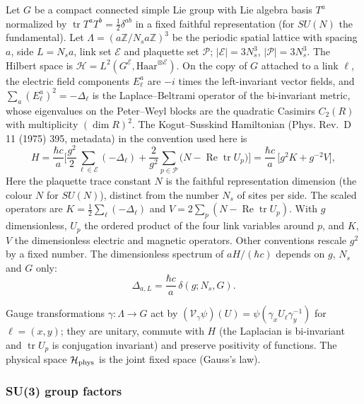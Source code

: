\documentclass[11pt,a4paper]{article}
\begin{document}
Let \(G\) be a compact connected simple Lie group with Lie algebra basis
\(T^a\) normalized by \(\operatorname{tr}T^aT^b=\tfrac12\delta^{ab}\) in
a fixed faithful representation (for \(SU(N)\) the fundamental). Let
\(\Lambda=(a\mathbb Z/N_sa\mathbb Z)^3\) be the periodic spatial lattice
with spacing \(a\), side \(L=N_sa\), link set \(\mathcal E\) and
plaquette set \(\mathcal P\); \(|\mathcal E|=3N_s^3\),
\(|\mathcal P|=3N_s^3\). The Hilbert space is
\(\mathcal H=L^2(G^{\mathcal E},\mathrm{Haar}^{\otimes\mathcal E})\). On
the copy of \(G\) attached to a link \(\ell\), the electric field
components \(E^a_\ell\) are \(-i\) times the left-invariant vector
fields, and \(\sum_a(E^a_\ell)^2=-\Delta_\ell\) is the Laplace--Beltrami
operator of the bi-invariant metric, whose eigenvalues on the
Peter--Weyl blocks are the quadratic Casimirs \(C_2(R)\) with
multiplicity \((\dim R)^2\). The Kogut--Susskind Hamiltonian (Phys.
Rev.~D 11 (1975) 395, metadata) in the convention used here is
\[H=\frac{\hbar c}{a}\Big[\frac{g^2}{2}\sum_{\ell\in\mathcal E}(-\Delta_\ell)
+\frac{2}{g^2}\sum_{p\in\mathcal P}\big(N-\operatorname{Re}\operatorname{tr}U_p\big)\Big]
=\frac{\hbar c}{a}\,\big[g^2K+g^{-2}V\big],\] Here the plaquette trace
constant \(N\) is the faithful representation dimension (the colour
\(N\) for \(SU(N)\)), distinct from the number \(N_s\) of sites per
side. The scaled operators are \(K=\tfrac12\sum_\ell(-\Delta_\ell)\) and
\(V=2\sum_p(N-\operatorname{Re}\operatorname{tr}U_p)\). With \(g\)
dimensionless, \(U_p\) the ordered product of the four link variables
around \(p\), and \(K\), \(V\) the dimensionless electric and magnetic
operators. Other conventions rescale \(g^2\) by a fixed number. The
dimensionless spectrum of \(aH/(\hbar c)\) depends on \(g\), \(N_s\) and
\(G\) only: \[\Delta_{a,L}=\frac{\hbar c}{a}\,\delta(g;N_s,G).\]

Gauge transformations \(\gamma:\Lambda\to G\) act by
\((\mathcal V_\gamma\psi)(U)=\psi(\gamma_xU_\ell\gamma_y^{-1})\) for
\(\ell=(x,y)\); they are unitary, commute with \(H\) (the Laplacian is
bi-invariant and \(\operatorname{tr}U_p\) is conjugation invariant) and
preserve positivity of functions. The physical space
\(\mathcal H_{\rm phys}\) is the joint fixed space (Gauss's law).

\subsubsection{SU(3) group factors}\label{su3-group-factors}
\end{document}
